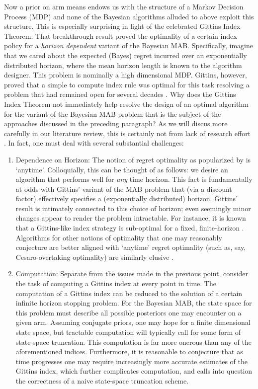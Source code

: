 Now a prior on arm means endows us with the structure of a Markov Decision Process (MDP) and none of the Bayesian algorithms alluded to above exploit this structure. This is especially surprising in light of the celebrated Gittins Index Theorem. That breakthrough result proved the optimality of a certain index policy for a {\em horizon dependent} variant of the Bayesian MAB. Specifically, imagine that we cared about the expected (Bayes) regret incurred over an exponentially distributed horizon, where the mean horizon length is known to the algorithm designer. This problem is nominally a high dimensional MDP. Gittins, however, proved that a simple to compute index rule was optimal for this task resolving a problem that had remained open for several decades \citep{gittins1979bandit}. Why does the Gittins Index Theorem not immediately help resolve the design of an optimal algorithm for the variant of the Bayesian MAB problem that is the subject of the approaches discussed in the preceding paragraph? As we will discus more carefully in our literature review, this is certainly not from lack of research effort \citep{lattimore2016bayesregret}. In fact, one must deal with several substantial challenges:
\begin{enumerate}
\item
Dependence on Horizon: The notion of regret optimality as popularized by \cite{lai1985asymptotically} is `anytime'. Colloquially, this can be thought of as follows: we desire an algorithm that performs well for {\em any} time horizon. This fact is fundamentally at odds with Gittins' variant of the MAB problem that (via a discount factor) effectively specifies a (exponentially distributed) horizon. Gittins' result is intimately connected to this choice of horizon; even seemingly minor changes appear to render the problem intractable. For instance, it is known that a Gittins-like index strategy is sub-optimal for a fixed, finite-horizon \citep{berry1985bandit}. Algorithms for other notions of optimality that one may reasonably conjecture are better aligned with `anytime' regret optimality (such as, say, Cesaro-overtaking optimality) are similarly elusive \citep{katehakis1996finite}.  
\item
Computation: Separate from the issues made in the previous point, consider the task of computing a Gittins index at every point in time. 
The computation of a Gittins index can be reduced to the solution of a certain infinite horizon stopping problem. For the Bayesian MAB, the state space for this problem must describe all possible posteriors one may encounter on a given arm. Assuming conjugate priors, one may hope for a finite dimensional state space, but tractable computation will typically call for some form of state-space truncation. This computation is far more onerous than any of the aforementioned indices. Furthermore, it is reasonable to conjecture that as time progresses one may require increasingly more accurate estimates of the Gittins index, which further complicates computation, and calls into question the correctness of a naive state-space truncation scheme. 
\end{enumerate}
